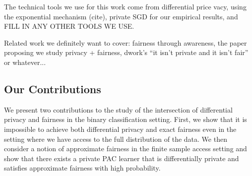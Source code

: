 The technical tools we use for this work come from differential price
vacy, using the exponential mechanism (cite), private SGD for our
empirical results, and FILL IN ANY OTHER TOOLS WE USE.



Related work we definitely want to cover: fairness through awareness,
the paper proposing we study privacy + fairness, dwork's ``it isn't
private and it isn't fair'' or whatever...

\subsection{Our Contributions}
We present two contributions to the study of the intersection of
differential privacy and fairness in the binary classification setting.
First, we show that it is impossible to achieve both differential
privacy and exact fairness even in the setting where we have access to
the full distribution of the data. We then consider a notion of
approximate fairness in the finite sample access setting and show that
there exists a private PAC learner that is differentially private and
satisfies approximate fairness with high probability. 

